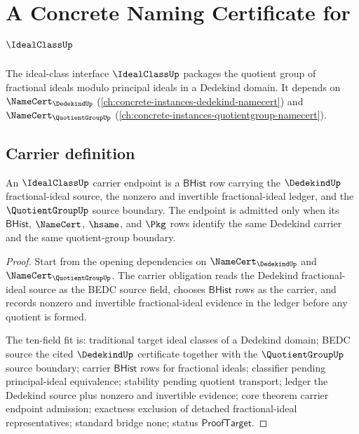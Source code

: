 \chapter{A Concrete Naming Certificate for $\IdealClassUp$}
\label{ch:concrete-instances-idealclass-namecert}

The ideal-class interface $\IdealClassUp$ packages the quotient group of fractional ideals modulo principal ideals in a Dedekind domain. It depends on $\NameCert_{\DedekindUp}$ (\autoref{ch:concrete-instances-dedekind-namecert}) and $\NameCert_{\QuotientGroupUp}$ (\autoref{ch:concrete-instances-quotientgroup-namecert}).

\section{Carrier definition}
\label{sec:idealclass-carrier}

\begin{theorem}\label{thm:idealclass-fractional-ideal-carrier-obligation}
An $\IdealClassUp$ carrier endpoint is a $\mathsf{BHist}$ row carrying the $\DedekindUp$ fractional-ideal source, the nonzero and invertible fractional-ideal ledger, and the $\QuotientGroupUp$ source boundary. The endpoint is admitted only when its $\mathsf{BHist}$, $\NameCert$, $\hsame$, and $\Pkg$ rows identify the same Dedekind carrier and the same quotient-group boundary.
\end{theorem}
\begin{proof}
Start from the opening dependencies on $\NameCert_{\DedekindUp}$ and $\NameCert_{\QuotientGroupUp}$. The carrier obligation reads the Dedekind fractional-ideal source as the BEDC source field, chooses $\mathsf{BHist}$ rows as the carrier, and records nonzero and invertible fractional-ideal evidence in the ledger before any quotient is formed.

The ten-field fit is: traditional target ideal classes of a Dedekind domain; BEDC source the cited $\DedekindUp$ certificate together with the $\QuotientGroupUp$ source boundary; carrier $\mathsf{BHist}$ rows for fractional ideals; classifier pending principal-ideal equivalence; stability pending quotient transport; ledger the Dedekind source plus nonzero and invertible evidence; core theorem carrier endpoint admission; exactness exclusion of detached fractional-ideal representatives; standard bridge none; status $\mathsf{ProofTarget}$.
\end{proof}

